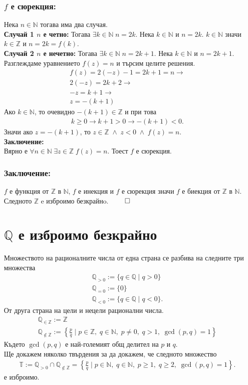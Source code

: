 \documentclass[a4paper, 12pt, oneside]{article}
\newcommand{\N}{\mathbb{N}}
\newcommand{\Z}{\mathbb{Z}}
\newcommand{\Q}{\mathbb{Q}}
\newcommand{\T}{\mathbb{T}}
\begin{document}
\subsubsection*{\(f\) е сюрекция:}
Нека \(n \in \N\) тогава има два случая. \\
\textbf{Случай 1 \(n\) е четно:}
Тогава \(\exists k \in \N \; n = 2k\).
Нека \(k \in \N\) и \(n = 2k\). \(k \in \N\) значи \(k \in \Z\) и \(n = 2k = f(k)\). \\
\textbf{Случай 2 \(n\) е нечетно:}
Тогава \(\exists k \in \N \; n = 2k + 1\).
Нека \(k \in \N\) и \(n = 2k + 1\). 
Разглеждаме уравнението \(f(z) = n\) и търсим целите решения.
\begin{align*}
    f(z) = 2(-z) - 1 = 2k + 1 = n  \longrightarrow \\
    2(-z) = 2k + 2 \longrightarrow \\
    -z = k + 1 \longrightarrow \\
    z = -(k + 1)
\end{align*}
Ако \(k \in \N\), то очевидно \(-(k + 1) \in \Z\) и при това
\begin{align*}
    k \geq 0 \longrightarrow k + 1 > 0 \longrightarrow -(k + 1) < 0.
\end{align*}
Значи ако \(z = -(k + 1)\), то \(z \in \Z \; \land \; z < 0 \; \land \; f(z) = n\). \\
\textbf{Заключение:} \\
Вярно е \(\forall n \in \N \; \exists z \in \Z \; f(z) = n\).
Тоест \(f\) е сюрекция.
\subsubsection*{Заключение:}
\(f\) е функция от \(\Z\)  в \(\N\),  \(f\) е инекция и \(f\) е сюрекция
значи \(f\) е биекция от \(\Z\)  в \(\N\). Следното \(\Z\) e изброимо безкрайнo. \(\qed\)
\section*{\(\Q\) е изброимо безкрайно}
Множеството на рационалните числа от една страна се разбива на следните три множества
\begin{align*}
    \Q_{> 0} := \{q \in \Q \; | \; q > 0\} \\
    \Q_{= 0} := \{0\} \\
    \Q_{< 0} := \{q \in \Q \; | \; q < 0\}.
\end{align*}
От друга страна на цели и нецели рационални числа.
\begin{align*}
    \Q_{\in \Z} := \Z \\
    \Q_{\notin \Z} := \left\{\frac{p}{q} \; \Big| \; p \in \Z, \; q \in \N, \; p \neq 0, \; q > 1, \; \gcd(p, q) = 1\right\}
\end{align*}
Където \(\gcd(p, q)\) е най-големият общ делител на \(p\) и \(q\). \\
Ще докажем няколко твърдения за да докажем, че следното множество
\begin{align*}
    \T := \Q_{> 0} \cap \Q_{\notin \Z} = \left\{\frac{p}{q} \; \Big| \; p \in \N, \; q \in \N, \; p \geq 1, \; q \geq 2, \; \gcd(p, q) = 1\right\}.
\end{align*}
е изброимо. 
\end{document}
